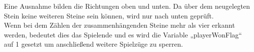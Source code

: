         Eine Ausnahme bilden die Richtungen oben und unten.
        Da über dem neugelegten Stein keine weiteren Steine sein können, wird nur nach unten geprüft.
        \\
        Wenn bei dem Zählen der zusammenhängenden Steine mehr als vier erkannt werden,
        bedeutet dies das Spielende und es wird die Variable „playerWonFlag“ auf 1 gesetzt um anschließend weitere Spielzüge zu sperren.

      